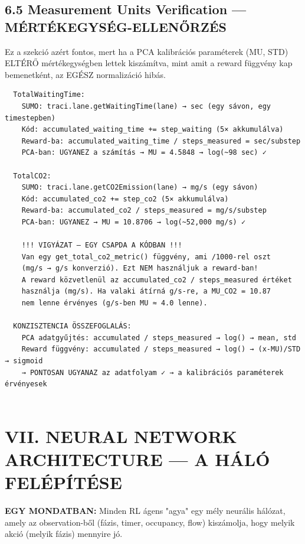 \documentclass[11pt,a4paper]{article}
\begin{document}
\subsection*{6.5 Measurement Units Verification — MÉRTÉKEGYSÉG-ELLENŐRZÉS}
Ez a szekció azért fontos, mert ha a PCA kalibrációs paraméterek
(MU, STD) ELTÉRŐ mértékegységben lettek kiszámítva, mint amit
a reward függvény kap bemenetként, az EGÉSZ normalizáció hibás.

\vspace{1em}\begin{verbatim}
  TotalWaitingTime:
    SUMO: traci.lane.getWaitingTime(lane) → sec (egy sávon, egy timestepben)
    Kód: accumulated_waiting_time += step_waiting (5× akkumulálva)
    Reward-ba: accumulated_waiting_time / steps_measured = sec/substep
    PCA-ban: UGYANEZ a számítás → MU = 4.5848 → log(~98 sec) ✓

  TotalCO2:
    SUMO: traci.lane.getCO2Emission(lane) → mg/s (egy sávon)
    Kód: accumulated_co2 += step_co2 (5× akkumulálva)
    Reward-ba: accumulated_co2 / steps_measured = mg/s/substep
    PCA-ban: UGYANEZ → MU = 10.8706 → log(~52,000 mg/s) ✓

    !!! VIGYÁZAT — EGY CSAPDA A KÓDBAN !!!
    Van egy get_total_co2_metric() függvény, ami /1000-rel oszt
    (mg/s → g/s konverzió). Ezt NEM használjuk a reward-ban!
    A reward közvetlenül az accumulated_co2 / steps_measured értéket
    használja (mg/s). Ha valaki átírná g/s-re, a MU_CO2 = 10.87
    nem lenne érvényes (g/s-ben MU ≈ 4.0 lenne).

  KONZISZTENCIA ÖSSZEFOGLALÁS:
    PCA adatgyűjtés: accumulated / steps_measured → log() → mean, std
    Reward függvény: accumulated / steps_measured → log() → (x-MU)/STD → sigmoid
    → PONTOSAN UGYANAZ az adatfolyam ✓ → a kalibrációs paraméterek érvényesek


\end{verbatim}
\section*{VII. NEURAL NETWORK ARCHITECTURE — A HÁLÓ FELÉPÍTÉSE}

\textbf{EGY MONDATBAN:}
Minden RL ágens "agya" egy mély neurális hálózat, amely az
observation-ből (fázis, timer, occupancy, flow) kiszámolja,
hogy melyik akció (melyik fázis) mennyire jó.
\end{document}
